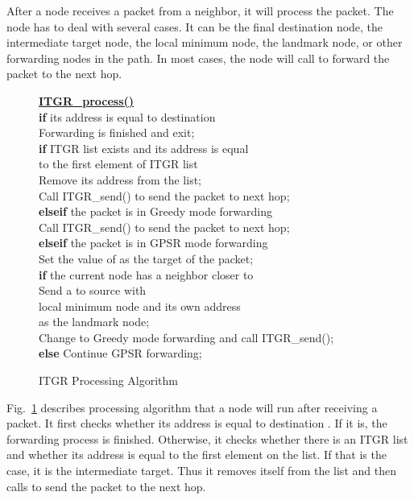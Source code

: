 \documentclass[3p,times]{elsarticle}
\begin{document}
After a node receives a packet from a neighbor, it will process the packet.
The node has to deal with several cases. It can be the final destination
node, the intermediate target node, the local minimum node,
the landmark node, or other forwarding nodes in the path.
In most cases, the node will call  to forward the packet
to the next hop.

\begin{figure}[hbt]
\baselineskip=10.2pt

{\small
  \noindent\underline{\bf ITGR\_process()} \\
  \text{~~~~}\textbf{if} its address is equal to destination  \\
  \text{~~~~~~~~}Forwarding is finished and exit;\\
  \text{~~~~}\textbf{if} ITGR list exists and its address is equal \\
  \text{~~~~~~~~~~~~}to the first element of ITGR list \\
  \text{~~~~~~~~}Remove its address from the list; \\
  \text{~~~~~~~~}Call ITGR\_send() to send the packet to next hop; \\
  \text{~~~~}\textbf{elseif} the packet is in Greedy mode forwarding \\
  \text{~~~~~~~~}Call ITGR\_send() to send the packet to next hop; \\
  \text{~~~~}\textbf{elseif} the packet is in GPSR mode forwarding \\
  \text{~~~~~~~~}Set the value of  as the target of the packet;\\
  \text{~~~~~~~~}\textbf{if} the current node has a neighbor closer to \\
  \text{~~~~~~~~~~~~}Send a  to source  with \\
  \text{~~~~~~~~~~~~~~~~}local minimum node  and its own address \\
  \text{~~~~~~~~~~~~~~~~}as the landmark node; \\
  \text{~~~~~~~~~~~~}Change to Greedy mode forwarding and call ITGR\_send(); \\
  \text{~~~~~~~~}\textbf{else} Continue GPSR forwarding; \\
}

\protect\caption{ITGR Processing Algorithm}
\protect\label{receivingfig}
\end{figure}


Fig.~\ref{receivingfig} describes processing algorithm 
that a node will run after receiving a packet.
It first checks whether its address is equal to
destination . If it is, the forwarding process is finished.
Otherwise, it checks whether there is an ITGR list and whether
its address is equal to the first element on the list.
If that is the case, it is the intermediate target.
Thus it removes itself from the list
and then calls  to send the packet to the next hop.
\end{document}
